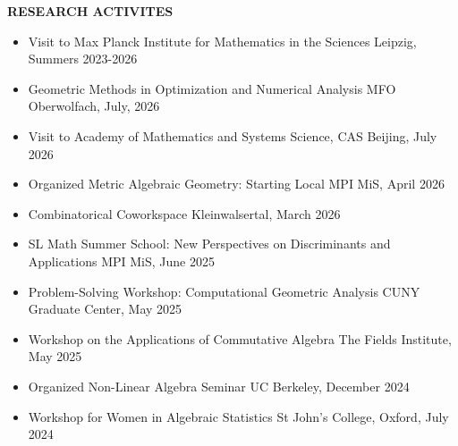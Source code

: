 \documentclass[11pt]{article}
\newcommand{\hdr}[1]{\textcolor{blue(ryb)}{\textbf{#1}}}
\begin{document}
\bigskip

\hdr{RESEARCH ACTIVITES}\\
\begin{itemize}
\item Visit to Max Planck Institute for Mathematics in the Sciences \hfill Leipzig, Summers 2023-2026
\item Geometric Methods in Optimization and Numerical Analysis \hfill MFO Oberwolfach, July, 2026
\item Visit to Academy of Mathematics and Systems Science, CAS \hfill Beijing, July 2026
\item Organized Metric Algebraic Geometry: Starting Local \hfill MPI MiS, April 2026
  \item Combinatorical Coworkspace \hfill Kleinwalsertal, March 2026
  \item SL Math Summer School: New Perspectives on Discriminants and Applications \hfill MPI MiS, June 2025
  \item Problem-Solving Workshop: Computational Geometric Analysis \hfill CUNY Graduate Center, May 2025
  \item Workshop on the Applications of Commutative Algebra \hfill The Fields Institute, May 2025
  \item Organized Non-Linear Algebra Seminar \hfill UC Berkeley, December 2024
  \item Workshop for Women in Algebraic Statistics \hfill St John's College, Oxford, July 2024
\end{itemize}

\bigskip
\end{document}
